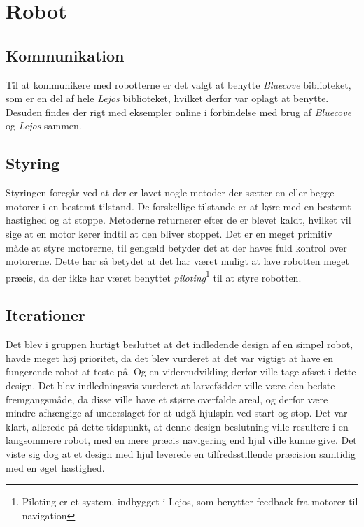 \chapter{Robot}

\section{Kommunikation}
Til at kommunikere med robotterne er det valgt at benytte \textit{Bluecove} biblioteket, som er en del af hele \textit{Lejos} biblioteket, hvilket derfor var oplagt at benytte. Desuden findes der rigt med eksempler online i forbindelse med brug af \textit{Bluecove} og \textit{Lejos} sammen.

\section{Styring}
Styringen foregår ved at der er lavet nogle metoder der sætter en eller begge motorer i en bestemt tilstand. De forskellige tilstande er at køre med en bestemt hastighed og at stoppe. Metoderne returnerer efter de er blevet kaldt, hvilket vil sige at en motor kører indtil at den bliver stoppet. Det er en meget primitiv måde at styre motorerne, til gengæld betyder det at der haves fuld kontrol over motorerne.
Dette har så betydet at det har været muligt at lave robotten meget præcis, da der ikke har været benyttet \textit{piloting}\footnote{Piloting er et system, indbygget i Lejos, som benytter feedback fra motorer til navigation} til at styre robotten.

\section{Iterationer}
Det blev i gruppen hurtigt besluttet at det indledende design af en simpel robot, havde meget høj prioritet, da det blev vurderet at det var vigtigt at have en fungerende robot at teste på. Og en videreudvikling derfor ville tage afsæt i dette design.
Det blev indledningsvis vurderet at larvefødder ville være den bedste fremgangsmåde, da disse ville have et større overfalde areal, og derfor være mindre afhængige af underslaget for at udgå hjulspin ved start og stop. Det var klart, allerede på dette tidspunkt, at denne design beslutning ville resultere i en langsommere robot, med en mere præcis navigering end hjul ville kunne give.
Det viste sig dog at et design med hjul leverede en tilfredsstillende præcision samtidig med en øget hastighed.


